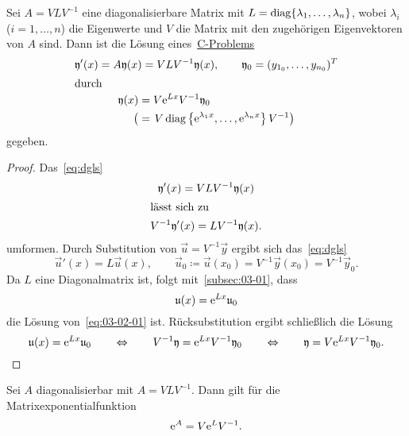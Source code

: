 \begin{theorem}\label{thm:diagbar-cp-solution}
    Sei $A = V L V^{-1}$ eine diagonalisierbare Matrix mit $L = \diag\{\lambda_1,\dots,\lambda_n\}$,
    wobei $\lambda_i$ ($i = 1,\dots,n$) die Eigenwerte und $V$ die Matrix mit den zugehörigen Eigenvektoren von $A$ sind.
    Dann ist die Lösung eines~\hyperref[eq:cp]{C-Problems}
    \begin{gather*}
        \vec{y}'(x) = A \vec{y}(x) = V L V^{-1} \vec{y}(x), \qquad \vec{y}_0 = (y_{1_0},\dots,y_{n_0})^T\\
        \intertext{durch}
        \begin{aligned}
            \vec{y}(x)
            &= V \e^{L x} V^{-1} \vec{y}_0\\
            \big( &= \left. V \diag\left\{\e^{\lambda_1 x}, \dots,\e^{\lambda_n x}\right\} V^{-1} \right)
        \end{aligned}
    \end{gather*}
    gegeben.
\end{theorem}

\begin{proof}
    Das~\ref{eq:dgls}
    \begin{gather*}
        \vec{y}'(x) = V L V^{-1} \vec{y}(x)\\
        \intertext{lässt sich zu}
        V^{-1} \vec{y}'(x) = L V^{-1} \vec{y}(x).
    \end{gather*}
    umformen.
    Durch Substitution von $\vec{u} = V^{-1} \vec{y}$ ergibt sich das~\ref{eq:dgls}
    \begin{equation}\tag{$\triangle$}\label{eq:03-02-01}
        \vec{u}'(x) = L \vec{u}(x), \qquad \vec{u}_0 \coloneqq \vec{u}(x_0) = V^{-1} \vec{y}(x_0) = V^{-1} \vec{y}_0.
    \end{equation}
    Da $L$ eine Diagonalmatrix ist, folgt mit~\autoref{subsec:03-01}, dass
    \begin{equation*}
        \vec{u}(x) = \e^{L x} \vec{u}_0
    \end{equation*}
    die Lösung von~\eqref{eq:03-02-01} ist.
    Rücksubstitution ergibt schließlich die Lösung
    \begin{equation*}
        \vec{u}(x) = \e^{L x} \vec{u}_0
        \qquad\Leftrightarrow\qquad V^{-1} \vec{y} = \e^{L x} V^{-1} \vec{y}_0
        \qquad\Leftrightarrow\qquad \vec{y} = V \e^{L x} V^{-1} \vec{y}_0.
    \end{equation*}
\end{proof}

\begin{corollary}
    Sei $A$ diagonalisierbar mit $A = V L V^{-1}$.
    Dann gilt für die Matrixexponentialfunktion
    \begin{equation*}
        \e^{A} = V \e^{L} V^{-1}.
    \end{equation*}
\end{corollary}

